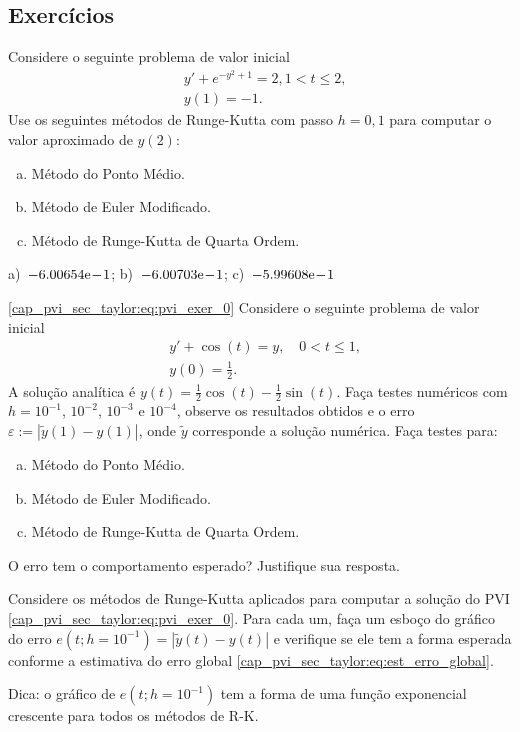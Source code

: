 \subsection{Exercícios}

\begin{exer}
  Considere o seguinte problema de valor inicial
  \begin{align}
    &y' + e^{-y^2+1} = 2, 1 < t \leq 2,\\
    &y(1) = -1.
  \end{align}
Use os seguintes métodos de Runge-Kutta com passo $h=0,1$ para computar o valor aproximado de $y(2)$:
\begin{enumerate}[a)]
\item Método do Ponto Médio.
\item Método de Euler Modificado.
\item Método de Runge-Kutta de Quarta Ordem.
\end{enumerate}
\end{exer}
\begin{resp}
  a)~$-6.00654\mathrm{e}\!-\!1$; b)~$-6.00703\mathrm{e}\!-\!1$; c)~$-5.99608\mathrm{e}\!-\!1$
\end{resp}

\begin{exer}\eqref{cap_pvi_sec_taylor:eq:pvi_exer_0}
  Considere o seguinte problema de valor inicial
  \begin{subequations}
    \begin{align}
      &y' + \cos(t) = y,\quad 0 < t \leq 1,\\
      &y(0) = \frac{1}{2}.
    \end{align}
  \end{subequations}
  A solução analítica é $y(t) = \frac{1}{2}\cos(t) - \frac{1}{2}\sin(t)$. Faça testes numéricos com $h=10^{-1}$, $10^{-2}$, $10^{-3}$ e $10^{-4}$, observe os resultados obtidos e o erro $\varepsilon := |\tilde{y}(1) - y(1)|$, onde $\tilde{y}$ corresponde a solução numérica. Faça testes para:
  \begin{enumerate}[a)]
  \item Método do Ponto Médio.
  \item Método de Euler Modificado.
  \item Método de Runge-Kutta de Quarta Ordem.
  \end{enumerate}
  O erro tem o comportamento esperado? Justifique sua resposta.
\end{exer}

\begin{exer}
  Considere os métodos de Runge-Kutta aplicados para computar a solução do PVI \eqref{cap_pvi_sec_taylor:eq:pvi_exer_0}. Para cada um, faça um esboço do gráfico do erro $e\left(t; h=10^{-1}\right) = \left|\tilde{y}(t) - y(t)\right|$ e verifique se ele tem a forma esperada conforme a estimativa do erro global \eqref{cap_pvi_sec_taylor:eq:est_erro_global}.
\end{exer}
\begin{resp}
  Dica: o gráfico de $e\left(t; h=10^{-1}\right)$ tem a forma de uma função exponencial crescente para todos os métodos de R-K.
\end{resp}

